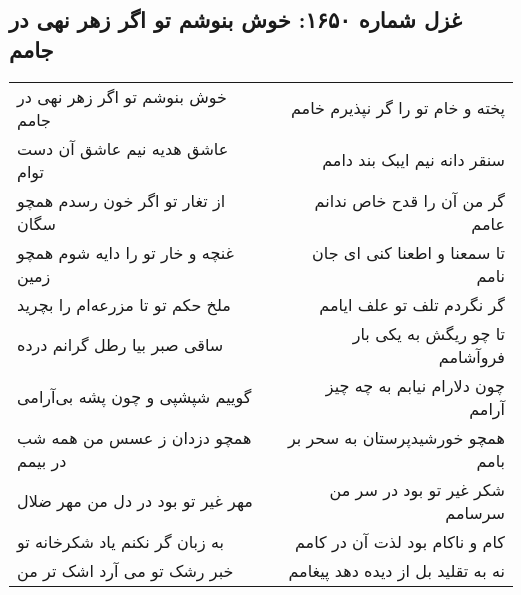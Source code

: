 \begin{center}
\section*{غزل شماره ۱۶۵۰: خوش بنوشم تو اگر زهر نهی در جامم}
\label{sec:1650}
\begin{longtable}{l p{0.5cm} r}
خوش بنوشم تو اگر زهر نهی در جامم
&&
پخته و خام تو را گر نپذیرم خامم
\\
عاشق هدیه نیم عاشق آن دست توام
&&
سنقر دانه نیم ایبک بند دامم
\\
از تغار تو اگر خون رسدم همچو سگان
&&
گر من آن را قدح خاص ندانم عامم
\\
غنچه و خار تو را دایه شوم همچو زمین
&&
تا سمعنا و اطعنا کنی ای جان نامم
\\
ملخ حکم تو تا مزرعه‌ام را بچرید
&&
گر نگردم تلف تو علف ایامم
\\
ساقی صبر بیا رطل گرانم درده
&&
تا چو ریگش به یکی بار فروآشامم
\\
گوییم شپشپی و چون پشه بی‌آرامی
&&
چون دلارام نیابم به چه چیز آرامم
\\
همچو دزدان ز عسس من همه شب در بیمم
&&
همچو خورشیدپرستان به سحر بر بامم
\\
مهر غیر تو بود در دل من مهر ضلال
&&
شکر غیر تو بود در سر من سرسامم
\\
به زبان گر نکنم یاد شکرخانه تو
&&
کام و ناکام بود لذت آن در کامم
\\
خبر رشک تو می آرد اشک تر من
&&
نه به تقلید بل از دیده دهد پیغامم
\\
\end{longtable}
\end{center}
